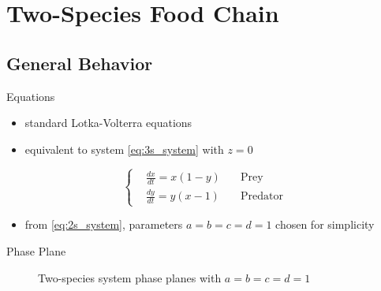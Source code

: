 \documentclass[hyperref={colorlinks,allcolors=black}]{beamer}
\begin{document}

\section{Two-Species Food Chain}

\subsection{General Behavior}

\begin{frame}{Equations}
    \begin{itemize}\setlength\itemsep{1em}
        \item standard Lotka-Volterra equations
        \item equivalent to system \eqref{eq:3s_system} with $z=0$
    \end{itemize}
%
    \begin{equation}
        \left\{\begin{aligned}
            &\frac{dx}{dt} = x(1 - y) \quad &\text{Prey}\\
            &\frac{dy}{dt} = y(x - 1) \quad &\text{Predator}
        \end{aligned}\right.
        \label{eq:2s_example}
    \end{equation}
%
    \begin{itemize}\setlength\itemsep{1em}
            \item from \eqref{eq:2s_system}, parameters $a=b=c=d=1$ chosen for 
                simplicity
    \end{itemize}
\end{frame}

\begin{frame}{Phase Plane}
    \begin{figure}[H]%
        \quad
        \captionsetup{justification=centering}
        \caption{Two-species system phase planes with $a=b=c=d=1$}%
        \label{fig:2s_phase_plane}%
    \end{figure}
\end{frame}
\end{document}
